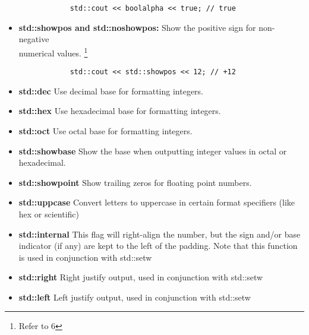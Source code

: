 \documentclass{report}
\begin{document}
\begin{itemize}
            \smallbreak
            \sepline
            \begin{verbatim}
            std::cout << boolalpha << true; // true
            \end{verbatim}
            \sepline
        \item \textbf{std::showpos and std::noshowpos:} Show the positive sign for non-negative \\ numerical values. \footnote{Refer to 6}
            \smallbreak
            \sepline
            \begin{verbatim}
            std::cout << std::showpos << 12; // +12
            \end{verbatim}
            \sepline
        \item \textbf{std::dec} Use decimal base for formatting integers.
        \item \textbf{std::hex} Use hexadecimal base for formatting integers.
        \item \textbf{std::oct} Use octal base for formatting integers.
        \item \textbf{std::showbase}  Show the base when outputting integer values in octal or hexadecimal.
        \item \textbf{std::showpoint} Show trailing zeros for floating point numbers.
        \item \textbf{std::uppcase} Convert letters to uppercase in certain format specifiers (like hex or scientific)
        \item \textbf{std::internal} This flag will right-align the number, but the sign and/or base indicator (if any) are kept to the left of the padding. Note that this function is used in conjunction with std::setw
        \item \textbf{std::right} Right justify output, used in conjunction with std::setw
        \item \textbf{std::left} Left justify output, used in conjunction with std::setw
    \end{itemize}
\end{document}
